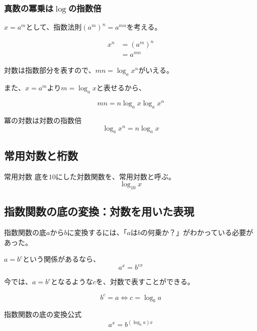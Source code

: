\documentclass[../math-imaging]{subfiles}
\begin{document}
\subsubsection{真数の冪乗は$\log$の指数倍}

$x = a^m$として、指数法則$(a^m)^n = a^{mn}$を考える。

\begin{align}
  x^n & = (a^m)^n \\
      & = a^{mn}
\end{align}

対数は指数部分を表すので、$mn = \log_a x^n$がいえる。

また、$x = a^m$より$m = \log_a x$と表せるから、

\begin{equation}
  mn = n \log_a x \log_a x^n
\end{equation}

\begin{theorem}{冪の対数は対数の指数倍}
  \LARGE
  \begin{equation}
    \log_a x^n = n \log_a x
  \end{equation}
\end{theorem}

\subsection{常用対数と桁数}

\wip

\begin{definition}{常用対数}
  底を$10$にした対数関数を、常用対数と呼ぶ。
  \LARGE
  \begin{equation}
    \log_{10} x
  \end{equation}
\end{definition}

\subsection{指数関数の底の変換：対数を用いた表現}

指数関数の底$a$から$b$に変換するには、「$a$は$b$の何乗か？」がわかっている必要があった。

\begin{review}
  $a=b^c$という関係があるなら、
  \begin{equation}
    a^x = b^{cx}
  \end{equation}
\end{review}

今では、$a= b^c$となるような$c$を、対数で表すことができる。

\begin{equation}
  b^c = a \Longleftrightarrow  c = \log_b a
\end{equation}

\begin{theorem}{指数関数の底の変換公式}
  \LARGE
  \begin{equation}
    a^x = b^{(\log_b a)x}
  \end{equation}
\end{theorem}
\end{document}
